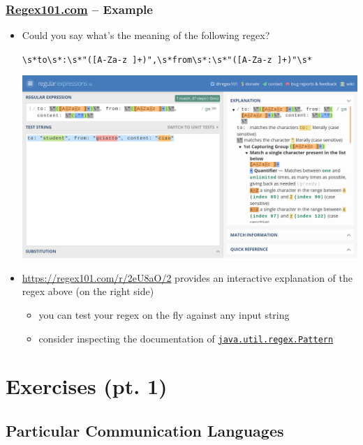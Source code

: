 \documentclass[presentation]{beamer}\mode<presentation>{\usetheme{AMSCesenaPurpleAndGold}}
\newcommand{\bs}[1]{\textbackslash{}#1}
\begin{document}
\begin{frame}
	\frametitle{\href{https://regex101.com/}{Regex101.com} -- Example}

	\begin{itemize}
		\item Could you say what's the meaning of the following regex?
		\begin{center}\small
			\alert{\texttt{\bs{s}*to\bs{s}*:\bs{s}*"([A-Za-z ]+)",\bs{s}*from\bs{s}*:\bs{s}*"([A-Za-z ]+)"\bs{s}*}}
		\end{center}
		\begin{center}
			\includegraphics[width=.7\linewidth]{./img/regex101.png}
		\end{center}

		\item \url{https://regex101.com/r/2eU8aO/2} provides an interactive explanation of the regex above (on the right side)
		\begin{itemize}
			\item you can test your regex on the fly against any input string
			\item consider inspecting the documentation of \href{https://docs.oracle.com/en/java/javase/14/docs/api/java.base/java/util/regex/Pattern.html}{\texttt{java.util.regex.\alert{Pattern}}}
		\end{itemize}

	\end{itemize}
\end{frame}

\section{Exercises (pt. 1)}

\startExercise

\subsection{Particular Communication Languages}
\end{document}
